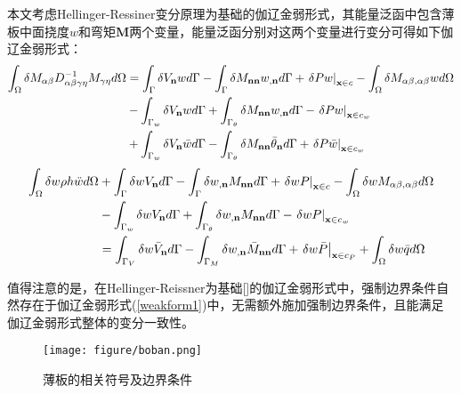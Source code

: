 \documentclass[a4paper]{article}
\begin{document}
本文考虑Hellinger-Ressiner变分原理为基础的伽辽金弱形式，其能量泛函中包含薄板中面挠度$w$和弯矩$\boldsymbol M$两个变量，能量泛函分别对这两个变量进行变分可得如下伽辽金弱形式：
\begin{equation}\label{weakform1}
    \begin{split}
        \int_\Omega {\delta {M_{\alpha \beta }}D_{\alpha \beta \gamma \eta }^{ - 1}{M_{\gamma \eta }}d\Omega }&=\int_\Gamma  {\delta {V_{\bf{n}}}wd\Gamma }  - \int_\Gamma  {\delta {M_{{\bf{nn}}}}{w_{,{\bf{n}}}}d\Gamma }+{\left. {\delta Pw} \right|_{{\bf{x}} \in c}} - \int_\Omega  {\delta {M_{\alpha \beta ,\alpha \beta }}wd\Omega } \\
        &-\int_{{\Gamma _w}} {\delta {V_{\bf{n}}}wd\Gamma }  + \int_{{\Gamma _\theta }} {\delta {M_{{\bf{nn}}}}{w_{,{\bf{n}}}}d\Gamma }  - {\left. {\delta Pw} \right|_{{\bf{x}} \in {c_w}}}\\
        &+\int_{{\Gamma _w}} {\delta {V_{\bf{n}}}\bar wd\Gamma }  - \int_{{\Gamma _\theta }} {\delta {M_{{\bf{nn}}}}{{\bar \theta }_{\bf{n}}}d\Gamma }  + {\left. {\delta P\bar w} \right|_{{\bf{x}} \in {c_w}}}
    
    \end{split}
\end{equation}
\begin{equation}
        \begin{split}
            \int_{\Omega}\delta w\rho h\ddot{w}d\Omega &+ \int_\Gamma  {\delta w{V_{\bf{n}}}d\Gamma } - \int_\Gamma  {\delta {w_{,{\bf{n}}}}{M_{{\bf{nn}}}}d\Gamma }  + {\left. {\delta wP} \right|_{{\bf{x}} \in c}} - \int_\Omega  {\delta w{M_{\alpha \beta ,\alpha\beta}}d\Omega }\\
            &- \int_{{\Gamma _w}} {\delta w{V_{\bf{n}}}d\Gamma }  + \int_{{\Gamma _\theta }} {\delta {w_{,{\bf{n}}}}{M_{{\bf{nn}}}}d\Gamma }  - {\left. {\delta wP} \right|_{{\bf{x}} \in {c_w}}}\\
            &= \int_{{\Gamma _V}} {\delta w{{\bar V}_{\bf{n}}}d\Gamma }  - \int_{{\Gamma _M}} {\delta {w_{,{\bf{n}}}}{{\bar M}_{{\bf{nn}}}}d\Gamma }  + {\left. {\delta w\bar P} \right|_{{\bf{x}} \in {c_P}}} + \int_\Omega  {\delta w\bar qd\Omega} 
    
        \end{split}
\end{equation} \par
值得注意的是，在Hellinger-Reissner为基础[]的伽辽金弱形式中，强制边界条件自然存在于伽辽金弱形式(\ref{weakform1})中，无需额外施加强制边界条件，且能满足伽辽金弱形式整体的变分一致性。
\begin{figure}[!h]
    \centering
    \texttt{[image: figure/boban.png]}
    \caption{薄板的相关符号及边界条件}
\end{figure}\newpage
\end{document}
